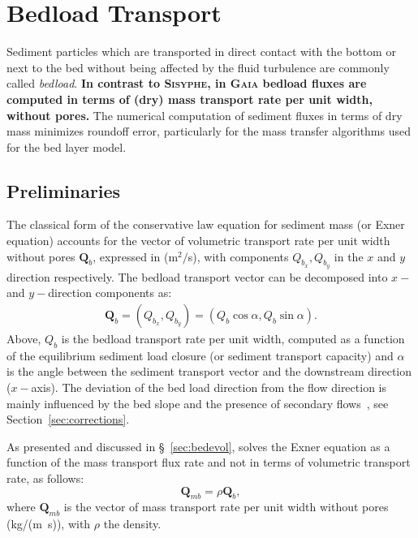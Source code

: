 \pagebreak
\section[Bedload sediment transport]{Bedload Transport}\label{sec:BedloadTransport}
Sediment particles which are transported in direct contact with the bottom or next to the bed without being affected by the fluid turbulence are commonly called \textit{bedload}. \textbf{In contrast to \textsc{Sisyphe}, in \textsc{Gaia} bedload fluxes are computed in terms of (dry) mass transport rate per unit width, without pores.} The numerical computation of sediment fluxes in terms of dry mass minimizes roundoff error, particularly for the mass transfer algorithms used for the bed layer model.

\subsection{Preliminaries}
The classical form of the conservative law equation for sediment mass (or Exner equation) accounts for the vector of volumetric transport rate per unit width without pores $\mathbf Q_b$, expressed in (m$^2/$s), with components $Q_{b_x}, Q_{b_y}$ in the $x$ and $y$ direction respectively. The bedload transport vector can be decomposed into $x-$ and $y-$direction components as:
\begin{align}
\mathbf Q_b = (Q_{b_x}, Q_{b_y}) = (Q_b \cos\alpha, Q_b \sin\alpha).
\label{eq:bedloadtransportvector}
\end{align}
Above, $Q_b$ is the bedload transport rate per unit width, computed as a function of the equilibrium sediment load closure (or sediment transport capacity) and $\alpha$ is the angle between the sediment transport vector and the downstream direction ($x-$axis). The deviation of the bed load direction from the flow direction is mainly influenced by the bed slope and the presence of secondary flows~\cite{Talmon95}, see Section~\ref{sec:corrections}.

As presented and discussed in \S~\ref{sec:bedevol}, \gaia{} solves the Exner equation as a function of the mass transport flux rate and not in terms of volumetric transport rate, as follows:
\begin{equation}
\mathbf Q_{mb}=\rho \mathbf Q_b,
\end{equation}
where $\mathbf Q_{mb}$ is the vector of mass transport rate per unit width without pores (kg/(m~s)), with $\rho$ the density.

